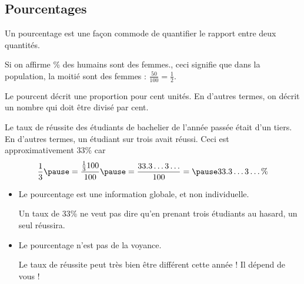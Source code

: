 \documentclass[french,xcolor=svgnames]{beamer}
\begin{document}
\subsection{Pourcentages}
\begin{frame}
  Un pourcentage est une façon commode de quantifier le rapport entre deux quantités.

\begin{example}
  Si on affirme \% des humains sont des femmes.\fg{},\pause{} ceci signifie que dans la population, la moitié sont des femmes : \(\frac{50}{100} = \frac{1}{2}\).
\end{example}
\pause

Le \og pourcent\fg{} décrit une proportion \og pour cent unités\fg{}.\pause{} En d'autres termes, on décrit un nombre qui doit être divisé par cent.\pause{}

\begin{example}
  \og Le taux de réussite des étudiants de bachelier de l'année passée était d'un tiers.\fg{}\pause{} En d'autres termes, un étudiant sur trois avait réussi.\pause{} Ceci est approximativement 33\% car
  \begin{equation*}
    \frac{1}{3} \pause= \frac{\frac{1}{3}100}{100} \pause= \frac{33.3\ldots3\ldots}{100} =\pause 33.3\ldots3\ldots\%
  \end{equation*}
\end{example}
\end{frame}

\begin{frame}
  \begin{itemize}
  \item Le pourcentage est une information globale, et non individuelle.\pause{}

    \begin{example}
      Un taux de 33\% ne veut pas dire qu'en prenant trois étudiants au hasard, un seul réussira.
    \end{example}
    \pause
  \item Le pourcentage n'est pas de la voyance.\pause{}

    \begin{example}
      Le taux de réussite peut très bien être différent cette année !\pause{} Il dépend de vous !
    \end{example}
  \end{itemize}
\end{frame}
\end{document}
